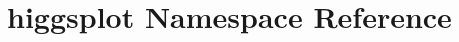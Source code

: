 \hypertarget{namespacehiggsplot}{
\section{higgsplot Namespace Reference}
\label{namespacehiggsplot}
}
